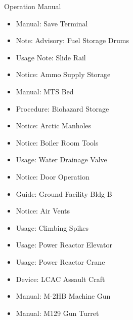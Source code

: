 \begin{manual}{Operation Manual}
    \begin{itemize}
        \item Manual: Save Terminal
        \item Note: Advisory: Fuel Storage Drums
        \item Usage Note: Slide Rail
        \item Notice: Ammo Supply Storage
        \item Manual: MTS Bed
        \item Procedure: Biohazard Storage
        \item Notice: Arctic Manholes
        \item Notice: Boiler Room Tools
        \item Usage: Water Drainage Valve
        \item Notice: Door Operation
        \item Guide: Ground Facility Bldg B
        \item Notice: Air Vents
        \item Usage: Climbing Spikes
        \item Usage: Power Reactor Elevator
        \item Usage: Power Reactor Crane
        \item Device: LCAC Assault Craft
        \item Manual: M-2HB Machine Gun
        \item Manual: M129 Gun Turret
    \end{itemize}
\end{manual}

